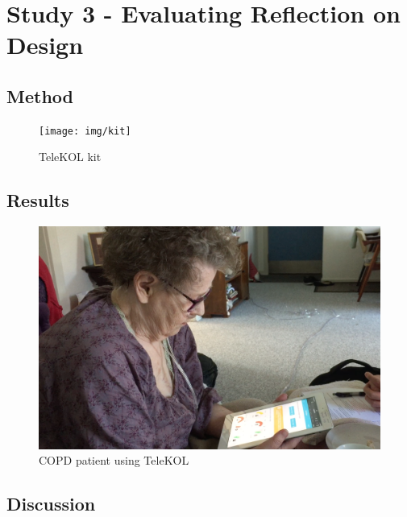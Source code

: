 \section{Study 3 - Evaluating Reflection on Design} 

\subsection{Method}

\begin{figure}[!h]
\centering
\texttt{[image: img/kit]}
\caption{TeleKOL kit}
\label{fig:kig}
\end{figure}

\subsection{Results}


\begin{figure}[!h]
\centering
\includegraphics[width=0.5\columnwidth]{img/AL}
\caption{COPD patient using TeleKOL}
\label{fig:AL}
\end{figure}

  
\subsection{Discussion}